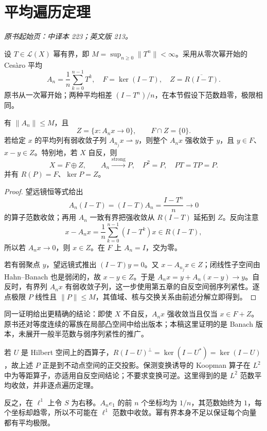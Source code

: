 \section{平均遍历定理}\label{sec:yosida-08-03}
\noindent\textit{原书起始页：中译本 223；英文版 213。}

设 $T\in\mathcal L(X)$ 幂有界，即 $M=\sup_{n\ge0}\|T^n\|<\infty$。采用从零次幂开始的 Ces\`aro 平均
\[
 A_n=\frac1n\sum_{k=0}^{n-1}T^k,\quad F=\ker(I-T),\quad
 Z=\overline{R(I-T)}.
\]
原书从一次幂开始；两种平均相差 $(I-T^n)/n$，在本节假设下范数趋零，极限相同。

\begin{theorem}[收敛子空间与弱聚点]\label{thm:y8-mean-ergodic}
有 $\|A_n\|\le M$，且
\begin{equation}\label{eq:y8-ergodic-kernel}
 Z=\{x:A_nx\to0\},\qquad F\cap Z=\{0\}.
\end{equation}
若给定 $x$ 的平均列有弱收敛子列 $A_{n_j}x\rightharpoonup y$，则整个 $A_nx$ 强收敛于 $y$，且 $y\in F$、$x-y\in Z$。特别地，若 $X$ 自反，则
\begin{equation}\label{eq:y8-ergodic-decomposition}
 X=F\oplus Z,\qquad A_n\xrightarrow{\mathrm{strong}}P,
 \quad P^2=P,\quad PT=TP=P.
\end{equation}
并有 $R(P)=F$、$\ker P=Z$。
\end{theorem}
\begin{proof}
望远镜恒等式给出
\[
 A_n(I-T)=(I-T)A_n=\frac{I-T^n}{n}\longrightarrow0
\]
的算子范数收敛；再用 $A_n$ 一致有界把强收敛从 $R(I-T)$ 延拓到 $Z$。反向注意
\[
 x-A_nx=\frac1n\sum_{k=0}^{n-1}(I-T^k)x\in R(I-T),
\]
所以若 $A_nx\to0$，则 $x\in Z$。在 $F$ 上 $A_n=I$，交为零。

若有弱聚点 $y$，望远镜式推出 $(I-T)y=0$。又 $x-A_{n_j}x\in Z$；闭线性子空间由 Hahn--Banach 也是弱闭的，故 $x-y\in Z$。于是 $A_nx=y+A_n(x-y)\to y$。自反时，有界列 $A_nx$ 有弱收敛子列，这一步使用第五章的自反空间弱序列紧性。逐点极限 $P$ 线性且 $\|P\|\le M$，其值域、核与交换关系由前述分解立即得到。
\end{proof}

同一证明给出更精确的结论：即使 $X$ 不自反，$A_nx$ 强收敛当且仅当 $x\in F+Z$。原书还对等度连续的幂族在局部凸空间中给出版本；本稿这里证明的是 Banach 版本，未展开一般半范数与弱序列紧性的推广。

\begin{example}
若 $U$ 是 Hilbert 空间上的酉算子，$R(I-U)^\perp=\ker(I-U^*)=\ker(I-U)$，故上述 $P$ 正是到不动点空间的正交投影。保测变换诱导的 Koopman 算子在 $L^2$ 中为等距算子，亦适用自反空间结论；不要求变换可逆。这里得到的是 $L^2$ 范数平均收敛，并非逐点遍历定理。

反之，在 $\ell^1$ 上令 $S$ 为右移。$A_ne_1$ 的前 $n$ 个坐标均为 $1/n$，其范数始终为 $1$，每个坐标却趋零，所以不可能在 $\ell^1$ 范数中收敛。幂有界本身不足以保证每个向量都有平均极限。
\end{example}

